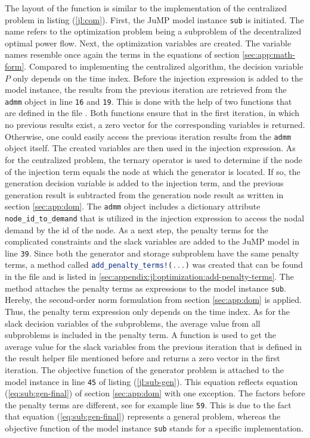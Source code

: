 The layout of the function is similar to the implementation of the centralized problem in listing (\ref{jl:com}). First, the JuMP model instance \lstinline[language=julia]{sub} is initiated. The name refers to the optimization problem being a subproblem of the decentralized optimal power flow. Next, the optimization variables are created. The variable names resemble once again the terms in the equations of section \ref{sec:app:math-form}. Compared to implementing the centralized algorithm, the decision variable $P$ only depends on the time index. Before the injection expression is added to the model instance, the results from the previous iteration are retrieved from the \lstinline[language=julia]{admm} object in line \texttt{16} and \texttt{19}. This is done with the help of two functions that are defined in the file . Both functions ensure that in the first iteration, in which no previous results exist, a zero vector for the corresponding variables is returned. Otherwise, one could easily access the previous iteration results from the \lstinline[language=julia]{admm} object itself. The created variables are then used in the injection expression. As for the centralized problem, the ternary operator is used to determine if the node of the injection term equals the node at which the generator is located. If so, the generation decision variable is added to the injection term, and the previous generation result is subtracted from the generation node result as written in section \ref{sec:app:dom}. The \lstinline[language=julia]{admm} object includes a dictionary attribute \lstinline[language=julia]{node_id_to_demand} that is utilized in the injection expression to access the nodal demand by the id of the node. As a next step, the penalty terms for the complicated constraints and the slack variables are added to the JuMP model in line \texttt{39}. Since both the generator and storage subproblem have the same penalty terms, a method called \lstinline[language=julia]{add_penalty_terms!(...)} was created that can be found in the file  and is listed in \ref{sec:appendix:jl:optimization:add-penalty-terms}. The method attaches the penalty terms as expressions to the model instance \lstinline[language=julia]{sub}. Hereby, the second-order norm formulation from section \ref{sec:app:dom} is applied. Thus, the penalty term expression only depends on the time index. As for the slack decision variables of the subproblems, the average value from all subproblems is included in the penalty term. A function is used to get the average value for the slack variables from the previous iteration that is defined in the result helper file mentioned before and returns a zero vector in the first iteration. The objective function of the generator problem is attached to the model instance in line \texttt{45} of listing (\ref{jl:sub-gen}). This equation reflects equation (\ref{eq:sub:gen-final}) of section \ref{sec:app:dom} with one exception. The factors before the penalty terms are different, see for example line \texttt{59}. This is due to the fact that equation (\ref{eq:sub:gen-final}) represents a general problem, whereas the objective function of the model instance \lstinline[language=julia]{sub} stands for a specific implementation. 